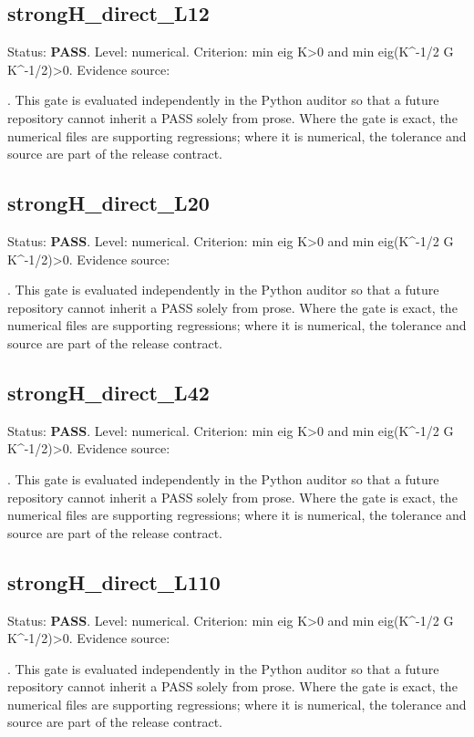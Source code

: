 \documentclass[11pt,a4paper,oneside]{book}
\begin{document}
\subsection{strongH\_direct\_L12}
Status: \textbf{PASS}. Level: numerical. Criterion: min eig K>0 and min eig(K\textasciicircum{}-1/2 G K\textasciicircum{}-1/2)>0. Evidence source:\par\noindent{}. This gate is evaluated independently in the Python auditor so that a future repository cannot inherit a PASS solely from prose. Where the gate is exact, the numerical files are supporting regressions; where it is numerical, the tolerance and source are part of the release contract.\par

\subsection{strongH\_direct\_L20}
Status: \textbf{PASS}. Level: numerical. Criterion: min eig K>0 and min eig(K\textasciicircum{}-1/2 G K\textasciicircum{}-1/2)>0. Evidence source:\par\noindent{}. This gate is evaluated independently in the Python auditor so that a future repository cannot inherit a PASS solely from prose. Where the gate is exact, the numerical files are supporting regressions; where it is numerical, the tolerance and source are part of the release contract.\par

\subsection{strongH\_direct\_L42}
Status: \textbf{PASS}. Level: numerical. Criterion: min eig K>0 and min eig(K\textasciicircum{}-1/2 G K\textasciicircum{}-1/2)>0. Evidence source:\par\noindent{}. This gate is evaluated independently in the Python auditor so that a future repository cannot inherit a PASS solely from prose. Where the gate is exact, the numerical files are supporting regressions; where it is numerical, the tolerance and source are part of the release contract.\par

\subsection{strongH\_direct\_L110}
Status: \textbf{PASS}. Level: numerical. Criterion: min eig K>0 and min eig(K\textasciicircum{}-1/2 G K\textasciicircum{}-1/2)>0. Evidence source:\par\noindent{}. This gate is evaluated independently in the Python auditor so that a future repository cannot inherit a PASS solely from prose. Where the gate is exact, the numerical files are supporting regressions; where it is numerical, the tolerance and source are part of the release contract.\par
\end{document}

